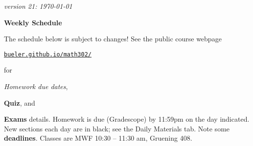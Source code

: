 \documentclass[12pt]{article}
\newcommand{\due}[1]{\strut {\color{BrickRed} \textsl{#1}}}
\newcommand{\ee}[1]{\strut {\color{Blue} \textbf{#1}}}
\newcommand{\dlinline}[1]{{\color{Purple} \textbf{#1}}}
\newcommand{\dl}[1]{{\small \dlinline{#1}}}
\begin{document}
\hfill \small \emph{version 21: \today} \normalsize

\bigskip\bigskip
\centerline{\Large \textbf{Weekly Schedule}}

\bigskip
The schedule below is subject to changes!  See the public course webpage

\medskip

\centerline{\href{https://bueler.github.io/math302/index.html}{\texttt{bueler.github.io/math302/}}}

\noindent for \due{Homework due dates}, \ee{Quiz}, and \ee{Exams} details.  Homework is due (Gradescope) by 11:59pm on the day indicated.  New sections each day are in black; see the Daily Materials tab.  Note some \dl{deadlines}.  Classes are MWF 10:30 -- 11:30 am, Gruening 408.

\bigskip
\end{document}
